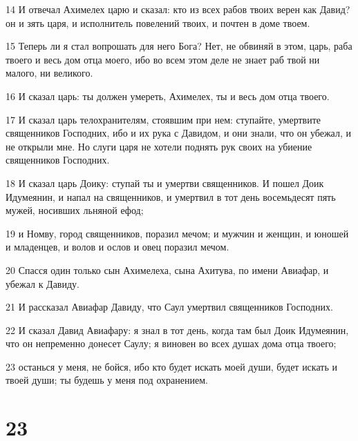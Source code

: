 \par 14 И отвечал Ахимелех царю и сказал: кто из всех рабов твоих верен как Давид? он и зять царя, и исполнитель повелений твоих, и почтен в доме твоем.
\par 15 Теперь ли я стал вопрошать для него Бога? Нет, не обвиняй в этом, царь, раба твоего и весь дом отца моего, ибо во всем этом деле не знает раб твой ни малого, ни великого.
\par 16 И сказал царь: ты должен умереть, Ахимелех, ты и весь дом отца твоего.
\par 17 И сказал царь телохранителям, стоявшим при нем: ступайте, умертвите священников Господних, ибо и их рука с Давидом, и они знали, что он убежал, и не открыли мне. Но слуги царя не хотели поднять рук своих на убиение священников Господних.
\par 18 И сказал царь Доику: ступай ты и умертви священников. И пошел Доик Идумеянин, и напал на священников, и умертвил в тот день восемьдесят пять мужей, носивших льняной ефод;
\par 19 и Номву, город священников, поразил мечом; и мужчин и женщин, и юношей и младенцев, и волов и ослов и овец поразил мечом.
\par 20 Спасся один только сын Ахимелеха, сына Ахитува, по имени Авиафар, и убежал к Давиду.
\par 21 И рассказал Авиафар Давиду, что Саул умертвил священников Господних.
\par 22 И сказал Давид Авиафару: я знал в тот день, когда там был Доик Идумеянин, что он непременно донесет Саулу; я виновен во всех душах дома отца твоего;
\par 23 останься у меня, не бойся, ибо кто будет искать моей души, будет искать и твоей души; ты будешь у меня под охранением.

\chapter{23}


